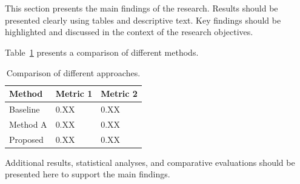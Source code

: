 \section*{}

This section presents the main findings of the research. Results should be presented clearly using tables and descriptive text. Key findings should be highlighted and discussed in the context of the research objectives.

Table~\ref{tab1} presents a comparison of different methods.

\begin{table}
\caption{Comparison of different approaches.}\label{tab1}
\centering
\begin{tabular}{|l|l|l|}
\hline
Method & Metric 1 & Metric 2\\
\hline
Baseline & 0.XX & 0.XX\\
Method A & 0.XX & 0.XX\\
Proposed & 0.XX & 0.XX\\
\hline
\end{tabular}
\end{table}

Additional results, statistical analyses, and comparative evaluations should be presented here to support the main findings.
